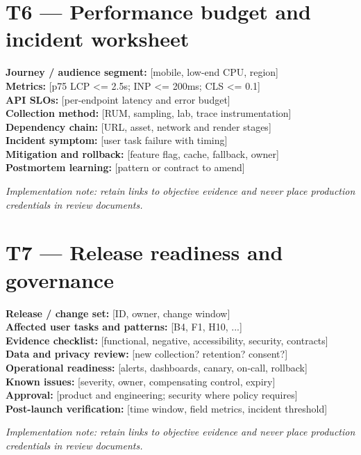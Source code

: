 \documentclass[11pt]{article}
\begin{document}
\section{T6 — Performance budget and incident worksheet}
\begin{notebox}
\textbf{Journey / audience segment:} [mobile, low-end CPU, region]\\
\textbf{Metrics:} [p75 LCP <= 2.5s; INP <= 200ms; CLS <= 0.1]\\
\textbf{API SLOs:} [per-endpoint latency and error budget]\\
\textbf{Collection method:} [RUM, sampling, lab, trace instrumentation]\\
\textbf{Dependency chain:} [URL, asset, network and render stages]\\
\textbf{Incident symptom:} [user task failure with timing]\\
\textbf{Mitigation and rollback:} [feature flag, cache, fallback, owner]\\
\textbf{Postmortem learning:} [pattern or contract to amend]\par\end{notebox}
\textit{Implementation note: retain links to objective evidence and never place production credentials in review documents.}
\section{T7 — Release readiness and governance}
\begin{notebox}
\textbf{Release / change set:} [ID, owner, change window]\\
\textbf{Affected user tasks and patterns:} [B4, F1, H10, ...]\\
\textbf{Evidence checklist:} [functional, negative, accessibility, security, contracts]\\
\textbf{Data and privacy review:} [new collection? retention? consent?]\\
\textbf{Operational readiness:} [alerts, dashboards, canary, on-call, rollback]\\
\textbf{Known issues:} [severity, owner, compensating control, expiry]\\
\textbf{Approval:} [product and engineering; security where policy requires]\\
\textbf{Post-launch verification:} [time window, field metrics, incident threshold]\par\end{notebox}
\textit{Implementation note: retain links to objective evidence and never place production credentials in review documents.}
\end{document}
